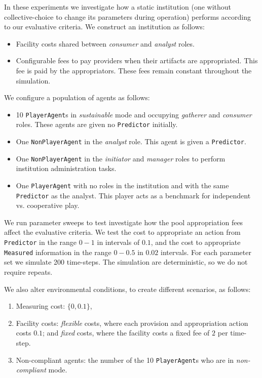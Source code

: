 In these experiments we investigate how a static institution (one without
collective-choice to change its parameters during operation) performs
according to our evaluative criteria. We construct an institution as follows:

\begin{itemize}
\item Facility costs shared between \emph{consumer} and \emph{analyst} roles.
\item Configurable fees to pay providers when their artifacts are appropriated. This fee is paid by the appropriators. These fees remain constant throughout the simulation.
\end{itemize}

We configure a population of agents as follows:

\begin{itemize}
\item 10 \texttt{PlayerAgent}s in \emph{sustainable} mode and occupying \emph{gatherer} and \emph{consumer} roles. These agents are given no \texttt{Predictor} initially.
\item One \texttt{NonPlayerAgent} in the \emph{analyst} role. This agent is given a \texttt{Predictor}.
\item One \texttt{NonPlayerAgent} in the \emph{initiator} and \emph{manager} roles to perform institution administration tasks.
\item One \texttt{PlayerAgent} with no roles in the institution and with the same \texttt{Predictor} as the analyst. This player acts as a benchmark for independent vs. cooperative play.
\end{itemize}

We run parameter sweeps to test investigate how the pool appropriation fees
affect the evaluative criteria. We test the cost to appropriate an action from
\texttt{Predictor} in the range $0-1$ in intervals of $0.1$, and the cost to
appropriate \texttt{Measured} information in the range $0-0.5$ in $0.02$
intervals. For each parameter set we simulate 200 time-steps. The simulation
are deterministic, so we do not require repeats.

We also alter environmental conditions, to create different scenarios, as follows:

\begin{enumerate}
\item Measuring cost: $\{0, 0.1\}$,
\item Facility costs: \emph{flexible} costs, where each provision and appropriation action costs $0.1$; and \emph{fixed} costs, where the facility costs a fixed fee of $2$ per time-step.
\item Non-compliant agents: the number of the 10 \texttt{PlayerAgent}s who are in \emph{non-compliant} mode.
\end{enumerate}

